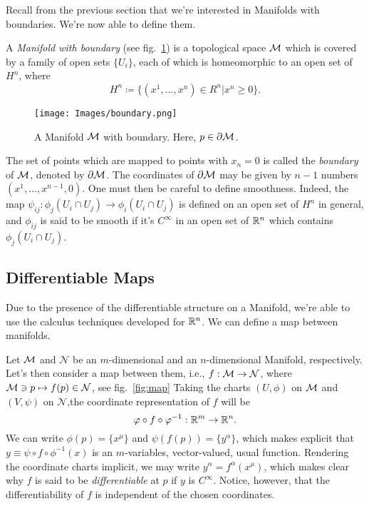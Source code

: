 Recall from the previous section that we're interested in Manifolds with boundaries. We're now able to define them.
\begin{definition}
    A \emph{Manifold with boundary} (see fig.~\ref{fig:boundary}) is a topological space $\mathcal{M}$ which is covered by a family of open sets $\{U_i\}$, each of which is homeomorphic to an open set of $H^n$, where
    \begin{equation}
        H^n \coloneq \{ (x^1, \dots, x^n) \in R^n | x^n \geq 0 \} .
    \end{equation} 
\end{definition}

\begin{figure}
    \centering
    \texttt{[image: Images/boundary.png]}
    \caption{A Manifold $\mathcal{M}$ with boundary. Here, $p \in \partial \mathcal{M}$.}
    \label{fig:boundary}
\end{figure}

The set of points which are mapped to points with $x_n = 0$ is called the \emph{boundary} of $\mathcal{M}$, denoted by $\partial \mathcal{M}$. The coordinates of $\partial \mathcal{M}$ may be given by $n-1$ numbers $(x^1, \dots, x^{n-1},0)$. One must then be careful to define smoothness. Indeed, the map $\psi_{ij} \colon \phi_j (U_i \cap U_j) \to \phi_i(U_i \cap U_j)$ is defined on an open set of $H^n$ in general, and $\phi_{ij}$ is said to be smooth if it's $C^\infty$ in an open set of $\mathbb{R}^n$ which contains $\phi_j(U_i \cap U_j)$.

\subsection{Differentiable Maps}
Due to the presence of the differentiable structure on a Manifold, we're able to use the calculus techniques developed for $\mathbb{R}^n$. We can define a map between manifolds.

Let $\mathcal{M}$ and $\mathcal{N}$  be an $m$-dimensional and an $n$-dimensional Manifold, respectively. Let's then consider a map between them, i.e., $f: \mathcal{M} \to \mathcal{N}$, where $\mathcal{M} \ni p \mapsto f(p) \in \mathcal{N}$, see fig.~\ref{fig:map} Taking the charts $(U, \phi)$ on $\mathcal{M}$ and $(V,\psi)$ on $\mathcal{N}$,the coordinate representation of $f$ will be
\begin{equation}
    \varphi \circ f \circ \varphi^{-1}: \mathbb{R}^m \to \mathbb{R}^n .
\end{equation}
We can write $\phi(p) = \{x^\mu\}$ and $\psi(f(p)) = \{y^\alpha\}$, which makes explicit that $y \equiv \psi \circ f \circ \phi^{-1}(x)$ is an $m$-variables, vector-valued, usual function. Rendering the coordinate charts implicit, we may write $y^\alpha = f^\alpha(x^\mu)$, which makes clear why $f$ is said to be \emph{differentiable} at $p$ if $y$ is $C^\infty$. Notice, however, that the differentiability of $f$ is independent of the chosen coordinates.

